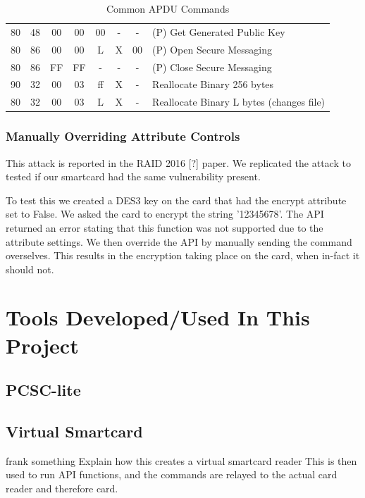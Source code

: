 \documentclass[bsc,frontabs,twoside,singlespacing,parskip,deptreport]{infthesis}     %
\begin{document}
\begin{table}[H]
\begin{tabular}{|c|c|c|c|c|c|c|p{8cm}|}
80  & 48  & 00 & 00 & 00  & -          & -  & (P) Get Generated Public Key\\
80  & 86  & 00 & 00 & L   & X          & 00 & (P) Open Secure Messaging\\
80  & 86  & FF & FF & -   & -          & -  & (P) Close Secure Messaging\\
\hline
90  & 32  & 00 & 03 & ff  & X          & -  &  Reallocate Binary 256 bytes\\
80  & 32  & 00 & 03 & L   & X          & -  &  Reallocate Binary L bytes (changes file)\\
\hline
\end{tabular}
\caption{Common APDU Commands}
\end{table} 


\subsection{Manually Overriding Attribute Controls}
This attack is reported in the RAID 2016 [?] paper. We replicated the attack to tested if our smartcard had the same vulnerability present. 

To test this we created a DES3 key on the card that had the encrypt attribute set to False. We asked the card to encrypt the string '12345678'. The API returned an error stating that this function was not supported due to the attribute settings. We then override the API by manually sending the command overselves. This results in the encryption taking place on the card, when in-fact it should not.



\chapter{Tools Developed/Used In This Project}



\section{PCSC-lite}

\section{Virtual Smartcard}
frank something
Explain how this creates a virtual smartcard reader
This is then used to run API functions, and the commands are relayed to the actual card reader and therefore card.
\end{document}
